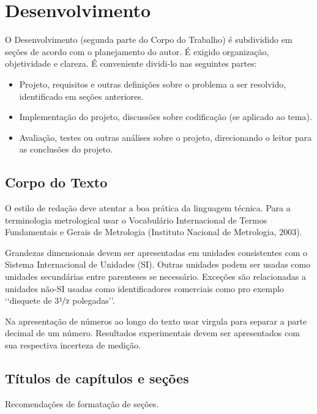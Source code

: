 
\chapter[Desenvolvimento]{Desenvolvimento}

O Desenvolvimento (segunda parte do Corpo do Trabalho) é subdividido em seções de acordo com o planejamento do autor. É exigido organização, objetividade e clareza. É conveniente dividi-lo nas seguintes partes:

\begin{itemize}

	\item Projeto, requisitos e outras definições sobre o problema a ser resolvido, identificado em seções anteriores.
	\item Implementação do projeto, discussões sobre codificação (se aplicado ao tema).
	\item Avaliação, testes ou outras análises sobre o projeto, direcionando o leitor para as conclusões do projeto.

\end{itemize}



\section{Corpo do Texto}

O estilo de redação deve atentar a boa prática da linguagem técnica. Para a terminologia metrological usar o Vocabulário Internacional de Termos Fundamentais e Gerais de Metrologia \cite{inmetro2003}  (Instituto Nacional de Metrologia, 2003).

Grandezas dimensionais devem ser apresentadas em unidades consistentes com  o Sistema Internacional de Unidades  (SI). Outras unidades podem ser usadas  como unidades secundárias entre parenteses se necessário. Exceções são relacionadas a unidades não-SI usadas como identificadores comerciais como pro exemplo \lq\lq disquete de  3$\nicefrac{1}{2}$ polegadas\rq\rq. 

Na apresentação de números ao longo do texto usar virgula para separar a parte decimal de um número. Resultados experimentais devem ser apresentados com sua respectiva incerteza de medição.

\section{Títulos de capítulos e seções}

Recomendações de formatação de seções. 

